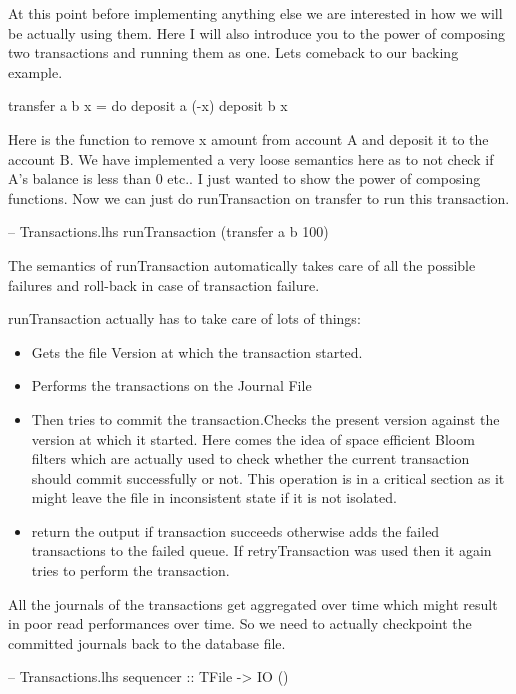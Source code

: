 \documentclass[11pt,a4paper]{article}
\begin{document}
At this point before implementing anything else we are interested in how
we will be actually using them. Here I will also introduce you to the
power of composing two transactions and running them as one. Lets
comeback to our backing example.

\begin{code}[name=Transactions]
transfer a b x = do 
  deposit a (-x) 
  deposit b x
\end{code}

Here is the function to remove x amount from account A and deposit it to
the account B. We have implemented a very loose semantics here as to not
check if A's balance is less than 0 etc.. I just wanted to show the power
of composing functions. Now we can just do runTransaction on transfer to
run this transaction.

\begin{code}[name=Transactions]
-- Transactions.lhs
runTransaction (transfer a b 100)
\end{code}

The semantics of runTransaction automatically
takes care of all the possible failures and roll-back in case of
transaction failure.

runTransaction actually has to take care of lots of things:

\begin{itemize}
\item Gets the file Version at which the transaction started.
\item Performs the transactions on the Journal File 
\item Then tries to commit the transaction.Checks the present version against the version at which it started. Here comes the idea of space efficient Bloom filters which are actually used to check whether the current transaction should commit successfully or not. This operation is in a critical section as it might leave the file in inconsistent state if it is not isolated. 
\item return the output if transaction succeeds otherwise adds the failed transactions to the failed queue. If retryTransaction was used then it again tries to perform the transaction. 
\end{itemize}

All the journals of the transactions get aggregated over time which might result in poor read performances over time. So we need to actually checkpoint the committed journals back to the database file.

\begin{code}[name=Transactions]
-- Transactions.lhs
sequencer :: TFile -> IO () 
\end{code}
\end{document}
